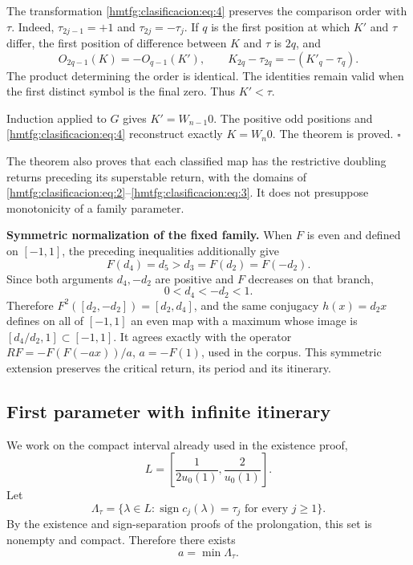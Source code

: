 The transformation \eqref{hmtfg:clasificacion:eq:4} preserves the comparison order with \(\tau\). Indeed, \(\tau_{2j-1}=+1\) and \(\tau_{2j}=-\tau_j\). If \(q\) is the first position at which \(K'\) and \(\tau\) differ, the first position of difference between \(K\) and \(\tau\) is \(2q\), and
\begin{equation}
O_{2q-1}(K)=-O_{q-1}(K'),
\qquad K_{2q}-\tau_{2q}=-(K'_q-\tau_q).
\label{hmtfg:clasificacion:eq:5}
\end{equation}
The product determining the order is identical. The identities remain valid when the first distinct symbol is the final zero. Thus \(K'<\tau\).

Induction applied to \(G\) gives \(K'=W_{n-1}0\). The positive odd positions and \eqref{hmtfg:clasificacion:eq:4} reconstruct exactly \(K=W_n0\). The theorem is proved. \(\square\)

The theorem also proves that each classified map has the restrictive doubling returns preceding its superstable return, with the domains of \eqref{hmtfg:clasificacion:eq:2}–\eqref{hmtfg:clasificacion:eq:3}. It does not presuppose monotonicity of a family parameter.

\textbf{Symmetric normalization of the fixed family.} When \(F\) is even and defined on \([-1,1]\), the preceding inequalities additionally give
\[
F(d_4)=d_5>d_3=F(d_2)=F(-d_2).
\]
Since both arguments \(d_4,-d_2\) are positive and \(F\) decreases on that branch,
\begin{equation}
0<d_4<-d_2<1.
\label{hmtfg:clasificacion:eq:5a}
\end{equation}
Therefore \(F^2([d_2,-d_2])=[d_2,d_4]\), and the same conjugacy \(h(x)=d_2x\) defines on all of \([-1,1]\) an even map with a maximum whose image is \([d_4/d_2,1]\subset[-1,1]\). It agrees exactly with the operator \(RF=-F(F(-ax))/a\), \(a=-F(1)\), used in the corpus. This symmetric extension preserves the critical return, its period and its itinerary.


\subsection{First parameter with infinite itinerary}
\label{hmtfg:clasificacion:3}

We work on the compact interval already used in the existence proof,
\[
L=\left[\frac1{2u_0(1)},\frac2{u_0(1)}\right].
\]
Let
\[
\Lambda_\tau=\{\lambda\in L:
\operatorname{sign}c_j(\lambda)=\tau_j\text{ for every }j\ge1\}.
\]
By the existence and sign-separation proofs of the prolongation, this set is nonempty and compact. Therefore there exists
\begin{equation}
a=\min\Lambda_\tau.
\label{hmtfg:clasificacion:eq:6}
\end{equation}


